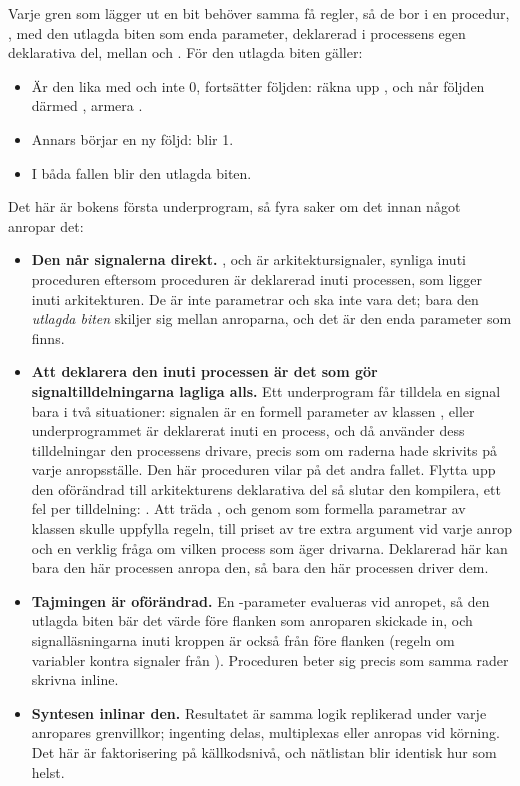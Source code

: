 Varje gren som lägger ut en bit behöver samma få regler, så de bor i en procedur, ,
med den utlagda biten som enda parameter, deklarerad i processens egen deklarativa del, mellan
 och . För den utlagda biten gäller:
\begin{itemize}
  \item Är den lika med  och  inte 0, fortsätter följden: räkna upp
    , och når följden därmed , armera .
  \item Annars börjar en ny följd:  blir 1.
  \item I båda fallen blir  den utlagda biten.
\end{itemize}

Det här är bokens första underprogram, så fyra saker om det innan något anropar det:
\begin{itemize}
  \item \textbf{Den når signalerna direkt.} ,  och
     är arkitektursignaler, synliga inuti proceduren eftersom proceduren är
    deklarerad inuti processen, som ligger inuti arkitekturen. De är inte parametrar och ska inte
    vara det; bara den \emph{utlagda biten} skiljer sig mellan anroparna, och det är den enda
    parameter som finns.
  \item \textbf{Att deklarera den inuti processen är det som gör signaltilldelningarna lagliga
    alls.} Ett underprogram får tilldela en signal bara i två situationer: signalen är en formell
    parameter av klassen , eller underprogrammet är deklarerat inuti en process, och då
    använder dess tilldelningar den processens drivare, precis som om raderna hade skrivits på varje
    anropsställe. Den här proceduren vilar på det andra fallet. Flytta upp den oförändrad till
    arkitekturens deklarativa del så slutar den kompilera, ett fel per tilldelning:
    . Att träda ,
     och  genom som formella parametrar av klassen 
    skulle uppfylla regeln, till priset av tre extra argument vid varje anrop och en verklig fråga om
    vilken process som äger drivarna. Deklarerad här kan bara den här processen anropa den, så bara
    den här processen driver dem.
  \item \textbf{Tajmingen är oförändrad.} En -parameter evalueras vid anropet, så den
    utlagda biten bär det värde före flanken som anroparen skickade in, och signalläsningarna inuti
    kroppen är också från före flanken (regeln om variabler kontra signaler från ).
    Proceduren beter sig precis som samma rader skrivna inline.
  \item \textbf{Syntesen inlinar den.} Resultatet är samma logik replikerad under varje anropares
    grenvillkor; ingenting delas, multiplexas eller anropas vid körning. Det här är faktorisering på
    källkodsnivå, och nätlistan blir identisk hur som helst.
\end{itemize}

